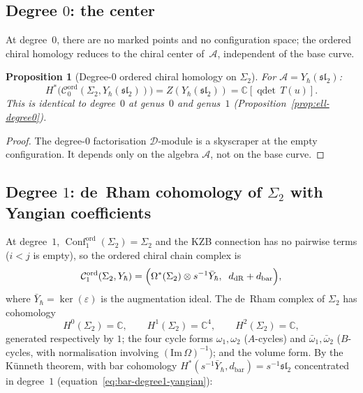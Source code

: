 \documentclass[11pt,reqno]{amsart}
\newtheorem{proposition}[theorem]{Proposition}
\theoremstyle{definition}
\theoremstyle{remark}
\newcommand{\cA}{\mathcal{A}}
\newcommand{\cC}{\mathcal{C}}
\newcommand{\cD}{\mathcal{D}}
\DeclareMathOperator{\Conf}{Conf}
\newcommand{\CC}{\mathbb{C}}
\numberwithin{equation}{section}
\begin{document}
\subsection{Degree $0$: the center}
\label{subsec:g2-degree0}

At degree~$0$, there are no marked points and no
configuration space; the ordered chiral homology reduces
to the chiral center of~$\cA$, independent of the base
curve.

\begin{proposition}[Degree-$0$ ordered chiral homology on
$\Sigma_2$]
\label{prop:g2-degree0}
For $\cA = Y_\hbar(\mathfrak{sl}_2)$:
\begin{equation}\label{eq:g2-degree0}
  H^*\bigl(\cC_0^{\mathrm{ord}}(\Sigma_2,
  Y_\hbar(\mathfrak{sl}_2))\bigr)
  = Z(Y_\hbar(\mathfrak{sl}_2))
  = \CC[\operatorname{qdet}\,T(u)].
\end{equation}
This is identical to degree~$0$ at genus~$0$
and genus~$1$
\textup{(}Proposition~\textup{\ref{prop:ell-degree0}}\textup{)}.
\end{proposition}

\begin{proof}
The degree-$0$ factorisation $\cD$-module is a skyscraper
at the empty configuration. It depends only on the algebra
$\cA$, not on the base curve.
\end{proof}

\subsection{Degree $1$: de~Rham cohomology of
$\Sigma_2$ with Yangian coefficients}
\label{subsec:g2-degree1}

At degree~$1$,
$\Conf_1^{\mathrm{ord}}(\Sigma_2) = \Sigma_2$ and the KZB
connection has no pairwise terms ($i < j$ is empty), so the
ordered chiral chain complex is
\begin{equation}\label{eq:g2-degree1-cx}
  \cC_1^{\mathrm{ord}}(\Sigma_2, Y_\hbar)
  = \Bigl(\Omega^*(\Sigma_2) \otimes s^{-1}\bar{Y}_\hbar,
  \;\; d_{\mathrm{dR}} + d_{\mathrm{bar}}\Bigr),
\end{equation}
where $\bar{Y}_\hbar = \ker(\varepsilon)$ is the
augmentation ideal.
The de~Rham complex of $\Sigma_2$ has cohomology
\begin{equation}\label{eq:dr-sigma2}
  H^0(\Sigma_2) = \CC, \qquad
  H^1(\Sigma_2) = \CC^4, \qquad
  H^2(\Sigma_2) = \CC,
\end{equation}
generated respectively by $1$; the four cycle forms
$\omega_1, \omega_2$ ($A$-cycles) and
$\bar{\omega}_1, \bar{\omega}_2$ ($B$-cycles, with
normalisation involving
$(\mathrm{Im}\,\Omega)^{-1}$); and the volume form.
By the K\"unneth theorem, with bar cohomology
$H^*(s^{-1}\bar{Y}_\hbar, d_{\mathrm{bar}}) =
s^{-1}\mathfrak{sl}_2$ concentrated in degree~$1$
(equation~\eqref{eq:bar-degree1-yangian}):
\end{document}
